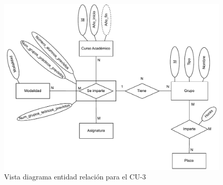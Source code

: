 \begin{figure}[!h]
	\centering
	\includegraphics[width=\textwidth]{../img/Anexos/Casos uso/Vistas ER/Diagrama E-R CU 3.pdf}
	\caption{Vista diagrama entidad relación para el CU-3}\label{er_cu3}
\end{figure}
\FloatBarrier

\newpage

